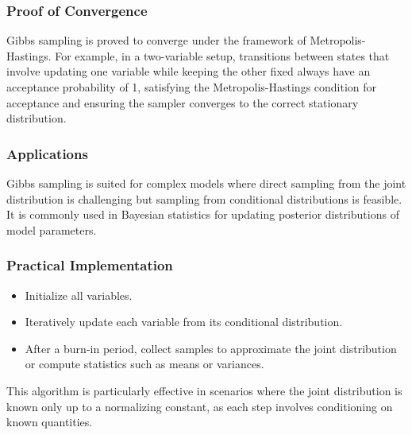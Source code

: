 \documentclass{article}
\begin{document}
\subsubsection{Proof of Convergence}
Gibbs sampling is proved to converge under the framework of Metropolis-Hastings. For example, in a two-variable setup, transitions between states that involve updating one variable while keeping the other fixed always have an acceptance probability of 1, satisfying the Metropolis-Hastings condition for acceptance and ensuring the sampler converges to the correct stationary distribution.

\subsubsection{Applications}
Gibbs sampling is suited for complex models where direct sampling from the joint distribution is challenging but sampling from conditional distributions is feasible. It is commonly used in Bayesian statistics for updating posterior distributions of model parameters.

\subsubsection{Practical Implementation}
\begin{itemize}
    \item Initialize all variables.
    \item Iteratively update each variable from its conditional distribution.
    \item After a burn-in period, collect samples to approximate the joint distribution or compute statistics such as means or variances.
\end{itemize}

This algorithm is particularly effective in scenarios where the joint distribution is known only up to a normalizing constant, as each step involves conditioning on known quantities.
\end{document}
